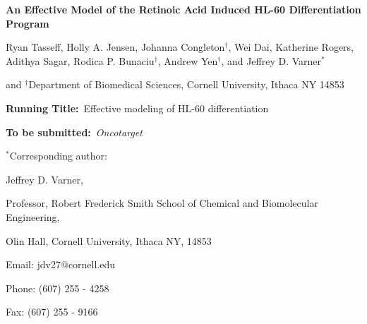 \documentclass[12pt]{article}
\begin{document}
\begin{titlepage}
{\par\centering\textbf{\Large {An Effective Model of the Retinoic Acid Induced HL-60 Differentiation Program}}}
\vspace{0.05in}
{\par \centering \large{Ryan Tasseff, Holly A. Jensen, Johanna Congleton$^{\dag}$, Wei Dai, Katherine Rogers, Adithya Sagar, Rodica P. Bunaciu$^{\dag}$, Andrew Yen$^{\dag}$, and Jeffrey D. Varner$^{*}$}}
\vspace{0.10in}
{\par {} and {$^{\dag}$Department of Biomedical Sciences, {Cornell University, Ithaca NY 14853}}}
\vspace{0.1in}
{\par \centering \textbf{Running Title:}~Effective modeling of HL-60 differentiation}
\vspace{0.1in}
{\par \centering \textbf{To be submitted:}~\emph{Oncotarget}}
\vspace{0.5in}
{\par \centering $^{*}$Corresponding author:}
{\par \centering Jeffrey D. Varner,}
{\par \centering Professor, Robert Frederick Smith School of Chemical and Biomolecular Engineering,}
{\par {} Olin Hall, Cornell University, Ithaca NY, 14853}
{\par \centering Email: jdv27@cornell.edu}
{\par \centering Phone: (607) 255 - 4258}
{\par \centering Fax: (607) 255 - 9166}
\end{titlepage}
\date{}
\thispagestyle{empty}
\pagebreak
\end{document}
